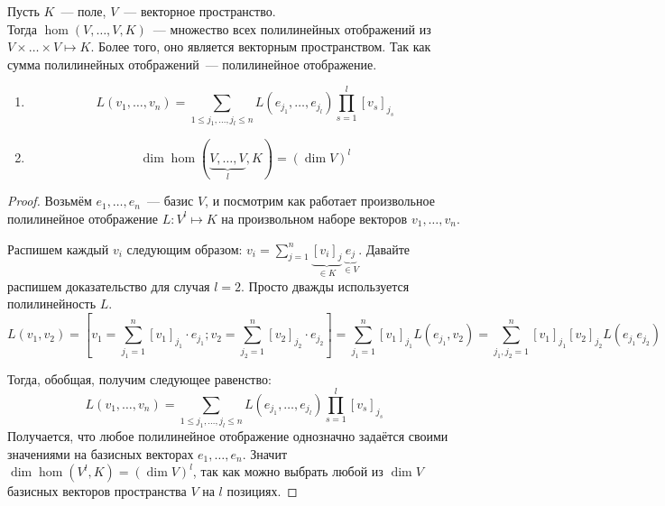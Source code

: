 \begin{definition}
    Пусть $K$~--- поле, $V$~--- векторное пространство.\\ 
    Тогда $\hom(V,\dots, V,K)$~--- множество всех полилинейных отображений
    из $V\times\dots\times V\mapsto K$.
    Более того, оно является векторным пространством. Так как сумма полилинейных
    отображений~--- полилинейное отображение.
\end{definition}
\begin{statement}\leavevmode
    \begin{enumerate}
        \item \[
                L(v_1,\dots, v_n) = \sum\limits_{1\le j_1, \dots, j_l \le n}^{}{L(e_{j_1}, \dots, e_{j_l})\prod\limits_{s=1}^{l}{[v_s]_{j_s}}}
            \]
        \item \[
                \dim \hom(\underbrace{V,\dots, V}_{l}, K) = (\dim V)^l
            \]
    \end{enumerate}
\end{statement}
\begin{proof}
    Возьмём $e_1,\dots, e_n$~--- базис $V$, и посмотрим как работает произвольное
    полилинейное отображение $L: V^{l} \mapsto K$ на произвольном наборе векторов $v_1,\dots, v_n$.

    Распишем каждый $v_i$ следующим образом: $v_i = \sum\limits_{j=1}^{n}{\underbrace{[v_i]_j}_{\in K}\underbrace{e_j}_{\in V}}$.
    Давайте распишем доказательство для случая $l=2$. Просто дважды используется полилинейность $L$.
    \[
        L(v_1, v_2) = \left[v_1 = \sum\limits_{j_1=1}^{n}{[v_1]_{j_1}\cdot e_{j_1}};
        v_2 = \sum\limits_{j_2=1}^{n}{[v_2]_{j_2}\cdot e_{j_2}}\right]=
        \sum\limits_{j_1=1}^{n}{[v_1]_{j_1}L(e_{j_1}, v_2)} =
        \sum\limits_{j_1,j_2=1}^{n}{[v_1]_{j_1}[v_2]_{j_2}L(e_{j_1}e_{j_2})}
    \]

    Тогда, обобщая, получим следующее равенство:
    \begin{equation}
        L(v_1,\dots, v_n) = \sum\limits_{1\le j_1, \dots, j_l \le n}^{}{L(e_{j_1}, \dots, e_{j_l})\prod\limits_{s=1}^{l}{[v_s]_{j_s}}} \label{eq:7:1}
    \end{equation} 
    Получается, что любое полилинейное отображение однозначно задаётся своими значениями на базисных векторах $e_1,\dots, e_n$.
    Значит $\dim \hom(V^l, K) = (\dim V)^l$, так как можно выбрать любой из $\dim V$ базисных векторов пространства $V$ на
    $l$ позициях.
\end{proof}
